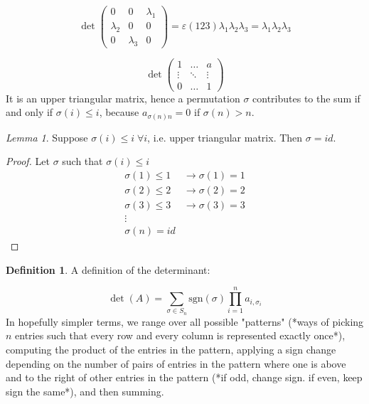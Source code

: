\documentclass[12pt]{article}
\theoremstyle{definition}
\newtheorem{definition}{Definition}[section]
\theoremstyle{remark}
\newtheorem{lemma}[theorem]{Lemma}
\begin{document}
\begin{example}
    $$\det \begin{pmatrix}
        0&0&\lambda_1 \\ \lambda_2 &0&0\\ 0&\lambda_3&0
    \end{pmatrix} = \varepsilon(123) \lambda_1 \lambda_2 \lambda_3 =  \lambda_1 \lambda_2 \lambda_3$$
\end{example}
\begin{example}
    $$\det \begin{pmatrix}
        1 &\hdots &a \\
        \vdots&\ddots&\vdots\\
        0&\hdots&1 
    \end{pmatrix}$$
    It is an upper triangular matrix, hence a permutation $\sigma$ contributes to the sum if and only 
    if $\sigma(i) \leq i$, because $a_{\sigma(n)n} = 0 $ if $\sigma(n) >n$.
\end{example}
\begin{lemma}
    Suppose $\sigma(i)\leq i \; \forall i $, i.e. upper triangular matrix. Then $\sigma = id$.
    \begin{proof}
        Let $\sigma$ such that $\sigma(i) \leq i$ 
        \begin{align*}
            \sigma(1) \leq 1 &\rightarrow \sigma(1) = 1 \\
            \sigma(2) \leq 2 &\rightarrow \sigma(2) = 2 \\ 
            \sigma(3) \leq 3 &\rightarrow \sigma(3) = 3 \\
            \vdots \\
            \sigma(n) = id &
        \end{align*}
    \end{proof}
\end{lemma}
\begin{definition}
    A definition of the determinant:

    $$\det(A) = \sum_{\sigma\in S_n}\text{sgn}(\sigma)\prod\limits_{i=1}^n a_{i,\sigma_i}$$
In hopefully simpler terms, we range over all possible "patterns" (*ways of picking $n$ entries such that every row 
and every column is represented exactly once*), computing the product of the entries in the pattern, applying a sign 
change depending on the number of pairs of entries in the pattern where one is above and to the right of other entries 
in the pattern (*if odd, change sign.  if even, keep sign the same*), and then summing.
\end{definition}
\end{document}

